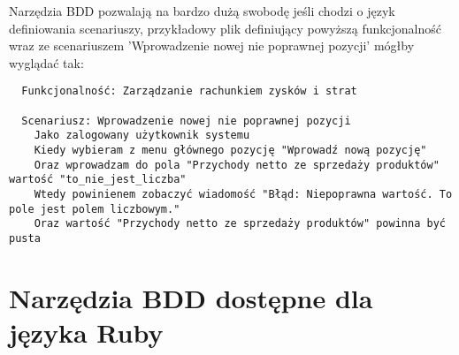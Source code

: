       Narzędzia BDD pozwalają na bardzo dużą swobodę jeśli chodzi o język definiowania scenariuszy, przykładowy plik definiujący powyższą funkcjonalność wraz ze scenariuszem 'Wprowadzenie nowej nie poprawnej pozycji' mógłby wyglądać tak:
      
\begin{verbatim}
  Funkcjonalność: Zarządzanie rachunkiem zysków i strat
  
  Scenariusz: Wprowadzenie nowej nie poprawnej pozycji
    Jako zalogowany użytkownik systemu
    Kiedy wybieram z menu głównego pozycję "Wprowadź nową pozycję"
    Oraz wprowadzam do pola "Przychody netto ze sprzedaży produktów" wartość "to_nie_jest_liczba"
    Wtedy powinienem zobaczyć wiadomość "Błąd: Niepoprawna wartość. To pole jest polem liczbowym."
    Oraz wartość "Przychody netto ze sprzedaży produktów" powinna być pusta
\end{verbatim}
      
  \section{Narzędzia BDD dostępne dla języka Ruby}

